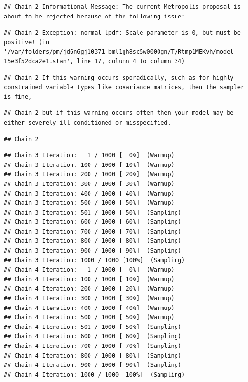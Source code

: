 \documentclass[
]{book}
\begin{document}
\begin{verbatim}
## Chain 2 Informational Message: The current Metropolis proposal is about to be rejected because of the following issue:
\end{verbatim}

\begin{verbatim}
## Chain 2 Exception: normal_lpdf: Scale parameter is 0, but must be positive! (in '/var/folders/pm/jd6n6gj10371_bml1gh8sc5w0000gn/T/Rtmp1MEKvh/model-15e3f52dca2e1.stan', line 17, column 4 to column 34)
\end{verbatim}

\begin{verbatim}
## Chain 2 If this warning occurs sporadically, such as for highly constrained variable types like covariance matrices, then the sampler is fine,
\end{verbatim}

\begin{verbatim}
## Chain 2 but if this warning occurs often then your model may be either severely ill-conditioned or misspecified.
\end{verbatim}

\begin{verbatim}
## Chain 2
\end{verbatim}

\begin{verbatim}
## Chain 3 Iteration:   1 / 1000 [  0%]  (Warmup) 
## Chain 3 Iteration: 100 / 1000 [ 10%]  (Warmup) 
## Chain 3 Iteration: 200 / 1000 [ 20%]  (Warmup) 
## Chain 3 Iteration: 300 / 1000 [ 30%]  (Warmup) 
## Chain 3 Iteration: 400 / 1000 [ 40%]  (Warmup) 
## Chain 3 Iteration: 500 / 1000 [ 50%]  (Warmup) 
## Chain 3 Iteration: 501 / 1000 [ 50%]  (Sampling) 
## Chain 3 Iteration: 600 / 1000 [ 60%]  (Sampling) 
## Chain 3 Iteration: 700 / 1000 [ 70%]  (Sampling) 
## Chain 3 Iteration: 800 / 1000 [ 80%]  (Sampling) 
## Chain 3 Iteration: 900 / 1000 [ 90%]  (Sampling) 
## Chain 3 Iteration: 1000 / 1000 [100%]  (Sampling) 
## Chain 4 Iteration:   1 / 1000 [  0%]  (Warmup) 
## Chain 4 Iteration: 100 / 1000 [ 10%]  (Warmup) 
## Chain 4 Iteration: 200 / 1000 [ 20%]  (Warmup) 
## Chain 4 Iteration: 300 / 1000 [ 30%]  (Warmup) 
## Chain 4 Iteration: 400 / 1000 [ 40%]  (Warmup) 
## Chain 4 Iteration: 500 / 1000 [ 50%]  (Warmup) 
## Chain 4 Iteration: 501 / 1000 [ 50%]  (Sampling) 
## Chain 4 Iteration: 600 / 1000 [ 60%]  (Sampling) 
## Chain 4 Iteration: 700 / 1000 [ 70%]  (Sampling) 
## Chain 4 Iteration: 800 / 1000 [ 80%]  (Sampling) 
## Chain 4 Iteration: 900 / 1000 [ 90%]  (Sampling) 
## Chain 4 Iteration: 1000 / 1000 [100%]  (Sampling)
\end{verbatim}
\end{document}
